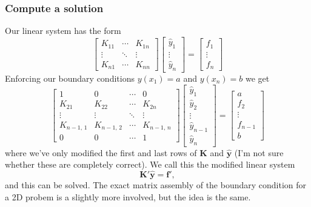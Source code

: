 \documentclass[acmtog]{acmart}
\begin{document}
%

\subsubsection{Compute a solution}
Our linear system has the form
%
\begin{equation}
  \begin{bmatrix}
    K_{11} & \cdots & K_{1n} \\
    \vdots & \ddots & \vdots \\
    K_{n1} & \cdots & K_{nn}
  \end{bmatrix}
  \begin{bmatrix}
    \hat{y}_1 \\
    \vdots    \\
    \hat{y}_n
  \end{bmatrix} = \begin{bmatrix}
    f_1    \\
    \vdots \\
    f_n
  \end{bmatrix}
\end{equation}
%
Enforcing our boundary conditions $y(x_1) = a$ and $y(x_n) = b$ we get
%
\begin{equation}
  \begin{bmatrix}
    1            & 0            & \cdots & 0             \\
    K_{21}       & K_{22}       & \cdots & K_{2n}        \\
    \vdots       & \vdots       & \ddots & \vdots        \\
    K_{n-1, \,1} & K_{n-1, \,2} & \cdots & K_{n-1, \, n} \\
    0            & 0            & \cdots & 1
  \end{bmatrix}
  \begin{bmatrix}
    \hat{y}_1     \\
    \hat{y}_2     \\
    \vdots        \\
    \hat{y}_{n-1} \\
    \hat{y}_n
  \end{bmatrix} = \begin{bmatrix}
    a       \\
    f_2     \\
    \vdots  \\
    f_{n-1} \\
    b
  \end{bmatrix}
\end{equation}
%
where we've only modified the first and last rows of $\boldsymbol K$ and
$\boldsymbol{\hat{y}}$ (I'm not sure whether these are completely correct). We
call this the modified linear system
%
\begin{equation}
  \boldsymbol {K'} \boldsymbol {\hat{y}} = \mathbf{f'},
\end{equation}
%
and this can be solved. The exact matrix assembly of the boundary condition for
a 2D probem is a slightly more involved, but the idea is the same.
\end{document}
